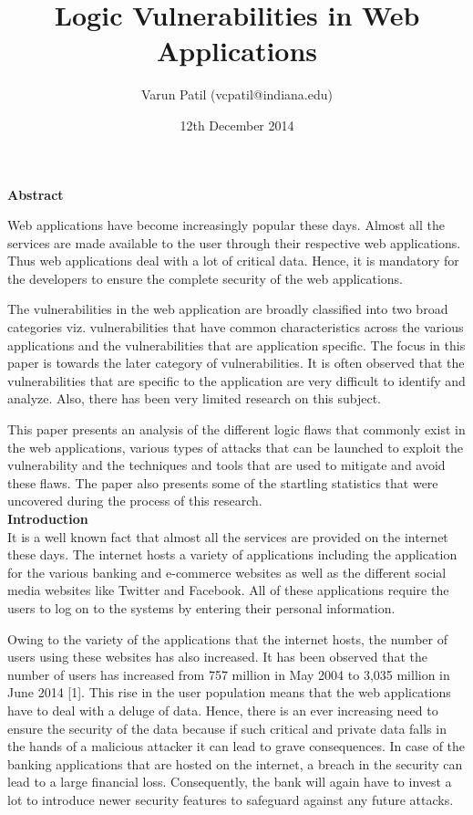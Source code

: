 \documentclass[11pt]{article}
\title{Logic Vulnerabilities in Web Applications}
\author{Varun Patil (vcpatil@indiana.edu)}
\date{12th December 2014}
\begin{document}
\maketitle

\textbf{Abstract}

Web applications have become increasingly popular these days. Almost all the services are made available to the user through their respective web applications. Thus web applications deal with a lot of critical data. Hence, it is mandatory for the developers to ensure the complete security of the web applications.


The vulnerabilities in the web application are broadly classified into two broad categories viz. vulnerabilities that have common characteristics across the various applications and the vulnerabilities that are application specific. The focus in this paper is towards the later category of vulnerabilities. It is often observed that the vulnerabilities that are specific to the application are very difficult to identify and analyze. Also, there has been very limited research on this subject.

This paper presents an analysis of the different logic flaws that commonly exist in the web applications, various types of attacks that can be launched to exploit the vulnerability and the  techniques and tools that are used to mitigate and avoid these flaws. The paper also presents some of the startling statistics that were uncovered during the process of this research.\\

\textbf{Introduction}\\
It is a well known fact that almost all the services are provided on the internet these days. The internet hosts a variety of applications including the application for the various banking and e-commerce websites as well as the different social media websites like Twitter and Facebook. All of these applications require the users to log on to the systems by entering their personal information.

 Owing to the variety of the applications that the internet hosts, the number of users using these websites has also increased. It has been observed that the number of users has increased from 757 million in May 2004 to 3,035 million in June 2014 [1]. This rise in the user population means that the web applications have to deal with a deluge of data. Hence, there is an ever increasing need to ensure the security of the data because if such critical and private data falls in the hands of a malicious attacker it can lead to grave consequences.  In case of the banking applications that are hosted on the internet, a breach in the security can lead to a large financial loss. Consequently, the bank will again have to invest a lot to introduce newer security features to safeguard against any future attacks.
 
\end{document}
